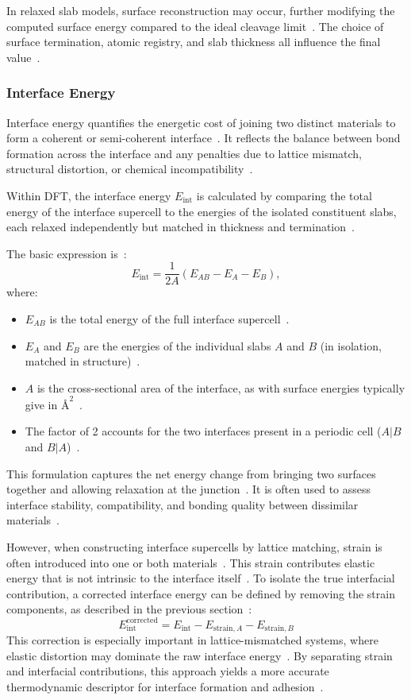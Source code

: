 In relaxed slab models, surface reconstruction may occur, further modifying the computed surface energy compared to the ideal cleavage limit~\nocite{}.
The choice of surface termination, atomic registry, and slab thickness all influence the final value~\nocite{}.

\subsubsection*{Interface Energy}

Interface energy quantifies the energetic cost of joining two distinct materials to form a coherent or semi-coherent interface~\nocite{}.
It reflects the balance between bond formation across the interface and any penalties due to lattice mismatch, structural distortion, or chemical incompatibility~\nocite{}.

Within DFT, the interface energy $E_\mathrm{int}$ is calculated by comparing the total energy of the interface supercell to the energies of the isolated constituent slabs, each relaxed independently but matched in thickness and termination~\nocite{}.

The basic expression is~\nocite{}:
\begin{equation}
    E_\mathrm{int} = \frac{1}{2A} \left( E_{AB} - E_A - E_B \right),
\end{equation}
where:
\begin{itemize}
    \item $E_{AB}$ is the total energy of the full interface supercell~\nocite{}.
    \item $E_A$ and $E_B$ are the energies of the individual slabs $A$ and $B$ (in isolation, matched in structure)~\nocite{}.
    \item $A$ is the cross-sectional area of the interface, as with surface energies typically give in $\text{\AA{}}^2$~\nocite{}.
    \item The factor of 2 accounts for the two interfaces present in a periodic cell ($A|B$ and $B|A$)~\nocite{}.
\end{itemize}
This formulation captures the net energy change from bringing two surfaces together and allowing relaxation at the junction~\nocite{}.
It is often used to assess interface stability, compatibility, and bonding quality between dissimilar materials~\nocite{}.

However, when constructing interface supercells by lattice matching, strain is often introduced into one or both materials~\nocite{}.
This strain contributes elastic energy that is not intrinsic to the interface itself~\nocite{}.
To isolate the true interfacial contribution, a corrected interface energy can be defined by removing the strain components, as described in the previous section~\nocite{}:
\begin{equation}
    E^\mathrm{corrected}_\mathrm{int} = E_\mathrm{int} - E_{\mathrm{strain},A} - E_{\mathrm{strain},B}
\end{equation}
This correction is especially important in lattice-mismatched systems, where elastic distortion may dominate the raw interface energy~\nocite{}.
By separating strain and interfacial contributions, this approach yields a more accurate thermodynamic descriptor for interface formation and adhesion~\nocite{}.

